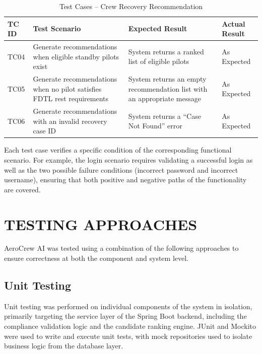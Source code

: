 \documentclass[12pt,a4paper]{report}
\begin{document}
\begin{table}[H]
\centering
\caption{Test Cases -- Crew Recovery Recommendation}
\begin{tabular}{|p{1.5cm}|p{5cm}|p{4cm}|p{4cm}|}
\hline
\textbf{TC ID} & \textbf{Test Scenario} & \textbf{Expected Result} & \textbf{Actual Result}\\
\hline

TC04 &
Generate recommendations when eligible standby pilots exist &
System returns a ranked list of eligible pilots &
As Expected\\
\hline

TC05 &
Generate recommendations when no pilot satisfies FDTL rest requirements &
System returns an empty recommendation list with an appropriate message &
As Expected\\
\hline

TC06 &
Generate recommendations with an invalid recovery case ID &
System returns a ``Case Not Found'' error &
As Expected\\
\hline

\end{tabular}
\end{table}

Each test case verifies a specific condition of the corresponding functional scenario. For example, the login scenario requires validating a successful login as well as the two possible failure conditions (incorrect password and incorrect username), ensuring that both positive and negative paths of the functionality are covered.

\section{TESTING APPROACHES}

AeroCrew AI was tested using a combination of the following approaches to ensure correctness at both the component and system level.

\subsection{Unit Testing}

Unit testing was performed on individual components of the system in isolation, primarily targeting the service layer of the Spring Boot backend, including the compliance validation logic and the candidate ranking engine. JUnit and Mockito were used to write and execute unit tests, with mock repositories used to isolate business logic from the database layer.
\end{document}
